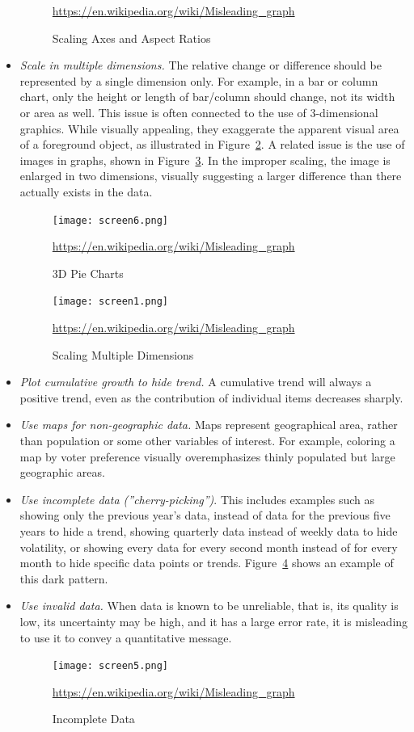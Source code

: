 \begin{itemize}
\begin{figure}
\scriptsize\url{https://en.wikipedia.org/wiki/Misleading_graph}
\caption{Scaling Axes and Aspect Ratios}
\label{fig:aspectratios}
\end{figure}
	\item \emph{Scale in multiple dimensions.} The relative change or difference should be represented by a single dimension only. For example, in a bar or column chart, only the height or length of bar/column should change, not its width or area as well. This issue is often connected to the use of 3-dimensional graphics. While visually appealing, they exaggerate the apparent visual area of a foreground object, as illustrated in Figure~\ref{fig:3dpie}. A related issue is the use of images in graphs, shown in Figure~\ref{fig:imagesgraphs}. In the improper scaling, the image is enlarged in two dimensions, visually suggesting a larger difference than there actually exists in the data.
\begin{figure}
\centering
\texttt{[image: screen6.png]}

\scriptsize\url{https://en.wikipedia.org/wiki/Misleading_graph}
\caption{3D Pie Charts}
\label{fig:3dpie}
\end{figure}
\begin{figure}
\centering
\texttt{[image: screen1.png]}

\scriptsize\url{https://en.wikipedia.org/wiki/Misleading_graph}
\caption{Scaling Multiple Dimensions}
\label{fig:imagesgraphs}
\end{figure}
	\item \emph{Plot cumulative growth to hide trend.} A cumulative trend will always a positive trend, even as the contribution of individual items decreases sharply.
	\item \emph{Use maps for non-geographic data.} Maps represent geographical area, rather than population or some other variables of interest. For example, coloring a map by voter preference visually overemphasizes thinly populated but large geographic areas.
	\item \emph{Use incomplete data (''cherry-picking'')}. This includes examples such as showing only the previous year's data, instead of data for the previous five years to hide a trend, showing quarterly data instead of weekly data to hide volatility, or showing every data for every second month instead of for every month to hide specific data points or trends. Figure~\ref{fig:omitted} shows an example of this dark pattern.
	\item \emph{Use invalid data.} When data is known to be unreliable, that is, its quality is low, its uncertainty may be high, and it has a large error rate, it is misleading to use it to convey a quantitative message. 
\begin{figure}
\centering
\texttt{[image: screen5.png]}

\scriptsize\url{https://en.wikipedia.org/wiki/Misleading_graph}
\caption{Incomplete Data}
\label{fig:omitted}
\end{figure}

\end{itemize}	

